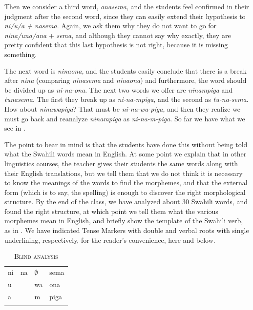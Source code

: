 \documentclass[output=paper,colorlinks,citecolor=brown]{langscibook}
\begin{document}
Then we consider a third word, \textit{anasema}, and the students feel confirmed in their judgment after the second word, since they can easily extend their hypothesis to \textit{ni/u/a + nasema}. Again, we ask them why they do not want to go for \textit{nina/una/ana} + \textit{sema}, and although they cannot say why exactly, they are pretty confident that this last hypothesis is not right, because it is missing something. 

The next word is \textit{ninaona}, and the students easily conclude that there is a break after \textit{nina} (comparing \textit{ninasema} and \textit{ninaona}) and furthermore, the word should be divided up as \textit{ni-na-ona}. The next two words we offer are \textit{ninampiga} and \textit{tunasema}. The first they break up as \textit{ni-na-mpiga}, and the second as \textit{tu-na-sema}. How about \textit{ninawapiga}? That must be \textit{ni-na-wa-piga}, and then they realize we must go back and reanalyze \textit{ninampiga} as \textit{ni-na-m-piga}. So far we have what we see in .

The point to bear in mind is that the students have done this without being told what the Swahili words mean in English. At some point we explain that in other linguistics courses, the teacher gives their students the same words along with their English translations, but we tell them that we do not think it is necessary to know the meanings of the words to find the morphemes, and that the external form (which is to say, the spelling) is enough to discover the right morphological structure. By the end of the class, we have analyzed about 30 Swahili words, and found the right structure, at which point we tell them what the various morphemes mean in English, and briefly show the template of the Swahili verb, as in . We have indicated Tense Markers with double and verbal roots with single underlining, respectively, for the reader's convenience, here and below. 



\begin{table}
\begin{tabular}{llll} \lsptoprule
ni & na & $\emptyset$ & sema \\
u &     & wa & ona \\
a &     & m  & piga \\ \lspbottomrule
\end{tabular}
\caption{\textsc{Blind analysis}}
\label{blind-analysis}
\end{table}
\end{document}
